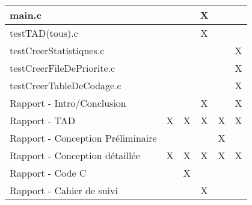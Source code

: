 \begin{table}[h]
\begin{tabular}{l|c|c|c|c|c|}
\multicolumn{1}{|l|}{main.c}                            &                       &               & X                       &                       &                        \\ \hline
\multicolumn{1}{|l|}{testTAD(tous).c}             &                       &                & X                      &                      &                        \\ \hline
\multicolumn{1}{|l|}{testCreerStatistiques.c}          &                       &               &                       &                       & X                       \\ \hline
\multicolumn{1}{|l|}{testCreerFileDePriorite.c}       &                       &                &                       &                      & X                       \\ \hline
\multicolumn{1}{|l|}{testCreerTableDeCodage.c}           &                       &                &                       &                       & X                      \\ \hline
\multicolumn{1}{|l|}{Rapport - Intro/Conclusion}        &                       &                & X                      &                       & X                      \\ \hline
\multicolumn{1}{|l|}{Rapport - TAD}                     & X                     & X              & X                     & X                     & X                      \\ \hline
\multicolumn{1}{|l|}{Rapport - Conception Préliminaire} &                       &               &                      & X                     &                        \\ \hline
\multicolumn{1}{|l|}{Rapport - Conception détaillée}    & X                     & X              & X                     & X                     & X                      \\ \hline
\multicolumn{1}{|l|}{Rapport - Code C}                  &                      & X               &                       &                       &                        \\ \hline
\multicolumn{1}{|l|}{Rapport - Cahier de suivi}         &                       &               & X                      &                       &                        \\ \hline
\end{tabular}
\end{table}
